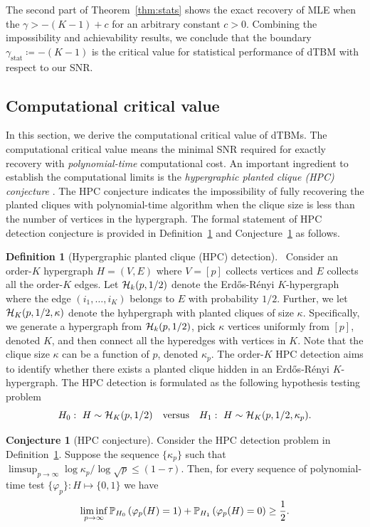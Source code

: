 \documentclass[journal]{IEEEtran}
\theoremstyle{definition}
\theoremstyle{definition}
\newtheorem{defn}{Definition}
\newtheorem{conjecture}{Conjecture}
\newcommand{\of}[1]{\left(#1\right)}
\begin{document}
The second part of Theorem~\ref{thm:stats} shows the exact recovery of MLE when the $\gamma>-(K-1)+c$ for an arbitrary constant $c>0$. Combining the impossibility and achievability results, we conclude that the boundary $\gamma_{\text{stat}} \coloneqq -(K-1)$ is the critical value for statistical performance of dTBM with respect to our SNR.

\subsection{Computational critical value}\label{sec:complimit}
In this section, we derive the computational critical value of dTBMs. The computational critical value means the minimal SNR required for exactly recovery with \emph{polynomial-time} computational cost. An important ingredient to establish the computational limits is the \emph{hypergraphic planted clique (HPC) conjecture} \citep{zhang2018tensor, brennan2020reducibility}. The HPC conjecture indicates the impossibility of fully recovering the planted cliques with polynomial-time algorithm when the clique size is less than the number of vertices in the hypergraph. The formal statement of HPC detection conjecture is provided in Definition~\ref{def:HPC} and Conjecture~\ref{hypo:HPC} as follows.  

\begin{defn}[Hypergraphic planted clique (HPC) detection]~\label{def:HPC} Consider an order-$K$ hypergraph $H = (V,E)$ where $V = [p]$ collects vertices and $E$ collects all the order-$K$ edges. Let $\mathcal{H}_k(p, 1/2)$ denote the Erd\H{o}s-R\'{e}nyi $K$-hypergraph where the edge $(i_1,\ldots, i_K)$ belongs to $E$ with probability $1/2$. Further, we let $\mathcal{H}_K(p, 1/2, \kappa)$ denote the hyhpergraph with planted cliques of size $\kappa$. Specifically, we generate a hypergraph from $\mathcal{H}_k(p, 1/2)$, pick $\kappa$ vertices uniformly from $[p]$, denoted $K$, and then connect all the hyperedges with vertices in $K$. Note that the clique size $\kappa$ can be a function of $p$, denoted $\kappa_p$. The order-$K$ HPC detection aims to identify whether there exists a planted clique hidden in an Erd\H{o}s-R\'{e}nyi $K$-hypergraph. The HPC detection is formulated as the following hypothesis testing problem
\begin{equation}
    H_0:\ H \sim \mathcal{H}_K(p,1/2) \quad \text{versus} \quad H_1: \ H \sim \mathcal{H}_K(p,1/2, \kappa_p).
\end{equation}
\end{defn}

\begin{conjecture}[HPC conjecture]\label{hypo:HPC} Consider the HPC detection problem in Definition~\ref{def:HPC}. Suppose the sequence $\{\kappa_p\}$ such that $\limsup_{p \rightarrow \infty} \log \kappa_p/ \log \sqrt{p} \leq (1 - \tau)$. Then, for every sequence of polynomial-time test $\{ \varphi_p\}: H \mapsto \{0,1\}$ we have 
\begin{equation}
    \liminf_{p \rightarrow \infty} \bbP_{H_0} \of{ \varphi_p(H) =1 } +  \bbP_{H_1} \of{ \varphi_p(H) =0} \geq \frac{1}{2}.
\end{equation}
\end{conjecture}
\end{document}
